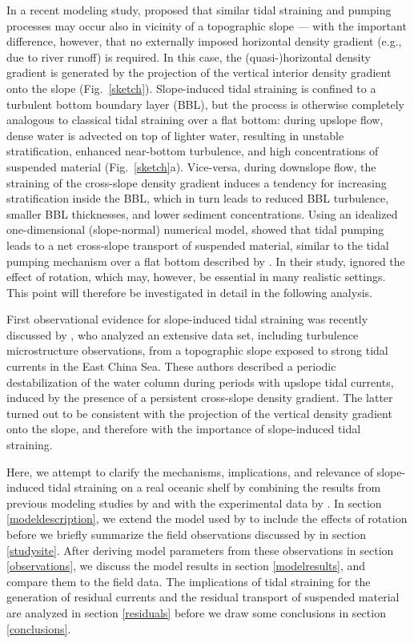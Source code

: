 In a recent modeling study, \cite{schulzumlauf2016} proposed that
similar tidal straining and pumping processes may occur also in
vicinity of a topographic slope --- with the important difference,
however, that no externally imposed horizontal density gradient (e.g.,
due to river runoff) is required. In this case, the (quasi-)horizontal
density gradient is generated by the projection of the vertical
interior density gradient onto the slope
(Fig.\ \ref{sketch}). Slope-induced tidal straining is confined to a
turbulent bottom boundary layer (BBL), but the process is otherwise
completely analogous to classical tidal straining over a flat bottom:
during upslope flow, dense water is advected on top of lighter water,
resulting in unstable stratification, enhanced near-bottom turbulence,
and high concentrations of suspended material
(Fig.\ \ref{sketch}a). Vice-versa, during downslope flow, the
straining of the cross-slope density gradient induces a tendency for
increasing stratification inside the BBL, which in turn leads to
reduced BBL turbulence, smaller BBL thicknesses, and lower sediment
concentrations. Using an idealized one-dimensional (slope-normal)
numerical model, \cite{schulzumlauf2016} showed that tidal pumping
leads to a net cross-slope transport of suspended material, similar to
the tidal pumping mechanism over a flat bottom described by
\cite{JayMusiak94a}. In their study, \cite{schulzumlauf2016} ignored
the effect of rotation, which may, however, be essential in many
realistic settings. This point will therefore be investigated in
detail in the following analysis.

First observational evidence for slope-induced tidal straining was
recently discussed by \cite{Endohetal2016a}, who analyzed an extensive
data set, including turbulence microstructure observations, from a
topographic slope exposed to strong tidal currents in the East China
Sea. These authors described a periodic destabilization of the water
column during periods with upslope tidal currents, induced by the
presence of a persistent cross-slope density gradient. The latter
turned out to be consistent with the projection of the vertical
density gradient onto the slope, and therefore with the importance of
slope-induced tidal straining.

Here, we attempt to clarify the mechanisms, implications, and
relevance of slope-induced tidal straining on a real oceanic shelf by
combining the results from previous modeling studies by
\cite{UmlaufBurchard2011a} and \cite{schulzumlauf2016} with the
experimental data by \cite{Endohetal2016a}.  In section
\ref{modeldescription}, we extend the model used by
\cite{schulzumlauf2016} to include the effects of rotation before we
briefly summarize the field observations discussed by
\cite{Endohetal2016a} in section \ref{studysite}. After deriving model
parameters from these observations in section \ref{observations}, we
discuss the model results in section \ref{modelresults}, and compare
them to the field data. The implications of tidal straining for the
generation of residual currents and the residual transport of
suspended material are analyzed in section \ref{residuals} before we
draw some conclusions in section \ref{conclusions}.


